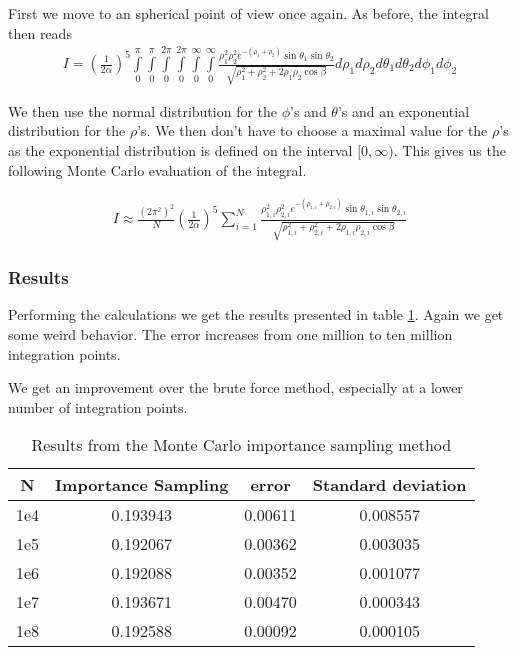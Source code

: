 \documentclass[11pt, a4paper]{article}
\begin{document}
First we move to an spherical point of view once again. As before, the integral then reads
\begin{gather}
I = \left(\frac{1}{2\alpha}\right)^5\int\limits_{0}^\pi\int\limits_{0}^\pi\int\limits_{0}^{2\pi}\int\limits_{0}^{2\pi}\int\limits_{0}^\infty\int\limits_{0}^\infty \frac{\rho_1^2\rho_2^2e^{-(\rho_1+\rho_2)}\sin{\theta_1}\sin\theta_2}{\sqrt{\rho_1^2+\rho_2^2+2\rho_1\rho_2\cos\beta}}d\rho_1d\rho_2d\theta_1d\theta_2d\phi_1d\phi_2 
\end{gather}

We then use the normal distribution for the $\phi$'s and $\theta$'s and an exponential distribution for the $\rho$'s. We then don't have to choose a maximal value for the $\rho$'s as the exponential distribution is defined on the interval $[0,\infty)$. This gives us the following Monte Carlo evaluation of the integral.

\begin{gather}
I \approx \frac{(2\pi^2)^2}{N}\left(\frac{1}{2\alpha}\right)^5\sum\limits_{i=1}^N \frac{\rho_{1,i}^2\rho_{2,i}^2e^{-(\rho_{1,i}+\rho_{2,i})}\sin{\theta_{1,i}}\sin\theta_{2,i}}{\sqrt{\rho_{1,i}^2+\rho_{2,i}^2+2\rho_{1,i}\rho_{2,i}\cos\beta}}
\end{gather}

\subsubsection*{Results}
Performing the calculations we get the results presented in table \ref{tab:importance}. Again we get some weird behavior. The error increases from one million to ten million integration points. 

We get an improvement over the brute force method, especially at a lower number of integration points.

\begin{table}[!ht]
\centering
\begin{tabular}{c|c|c|c}
N & Importance Sampling & error & Standard deviation\\
\hline
1e4 & 0.193943 & 0.00611 & 0.008557\\
1e5 & 0.192067 & 0.00362 & 0.003035\\
1e6 & 0.192088 & 0.00352 & 0.001077\\
1e7 & 0.193671 & 0.00470 & 0.000343\\
1e8 & 0.192588 & 0.00092 & 0.000105
\end{tabular}
\caption{Results from the Monte Carlo importance sampling method}
\label{tab:importance}
\end{table}
\clearpage
\end{document}
